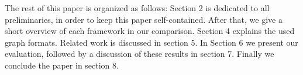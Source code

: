 The rest of this paper is organized as follows:
Section 2 is dedicated to all preliminaries, in order to keep this paper self-contained.
After that, we give a short overview of each framework in our comparison.
Section 4 explains the used graph formats.
Related work is discussed in section 5.
In Section 6 we present our evaluation, followed by a discussion of these results in section 7. Finally we conclude the paper in section 8.
